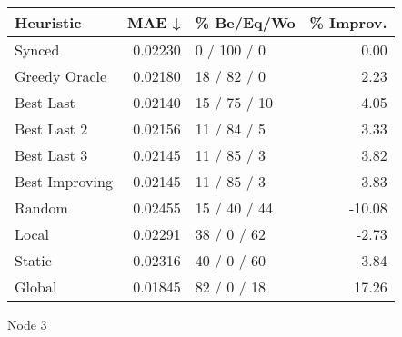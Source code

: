 \begin{tabular}{lrlr}
\toprule
\textbf{Heuristic} & \textbf{MAE ↓} & \textbf{\% Be/Eq/Wo} & \textbf{\% Improv.} \\
\midrule
            Synced &        0.02230 &          0 / 100 / 0 &                0.00 \\
     Greedy Oracle &        0.02180 &          18 / 82 / 0 &                2.23 \\
         Best Last &        0.02140 &         15 / 75 / 10 &                4.05 \\
       Best Last 2 &        0.02156 &          11 / 84 / 5 &                3.33 \\
       Best Last 3 &        0.02145 &          11 / 85 / 3 &                3.82 \\
    Best Improving &        0.02145 &          11 / 85 / 3 &                3.83 \\
            Random &        0.02455 &         15 / 40 / 44 &              -10.08 \\
             Local &        0.02291 &          38 / 0 / 62 &               -2.73 \\
            Static &        0.02316 &          40 / 0 / 60 &               -3.84 \\
            Global &        0.01845 &          82 / 0 / 18 &               17.26 \\
\bottomrule
\end{tabular}
\caption{Node 3}
\label{tab:non_lr05_le1_bs4_3}
